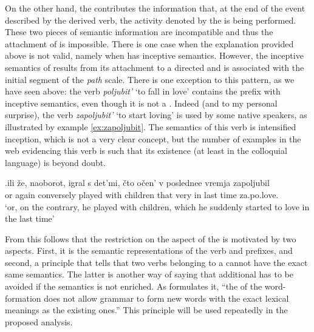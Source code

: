 On the other hand, the   contributes the information that, at the end of the event described by the derived verb, the activity denoted by the  is being performed. These two pieces of semantic information are incompatible and thus the attachment of  is impossible. There is one case when the explanation provided above is not valid, namely when  has inceptive semantics. However, the inceptive semantics of  results from its attachment to a directed  and is associated with the initial segment of the \textit{path} scale. There is one exception to this pattern, as we have seen above: the verb \textit{poljubit'} `to fall in love' contains the prefix  with inceptive semantics, even though it is not a . Indeed (and to my personal surprise), the verb \textit{zapoljubit'} `to start loving' is used by some native speakers, as illustrated by example \ref{ex:zapoljubit}. The semantics of this verb is intensified inception, which is not a very clear concept, but the number of examples in the web evidencing this verb is such that its existence (at least in the colloquial language) is beyond doubt.

\exg.\label{ex:zapoljubit}ili \v{z}e, naoborot, igral s det'mi, \v{c}to o\v{c}en' v poslednee vremja zapoljubil\\
or again conversely played with children that very in last time za.po.love.\\
\trans `or, on the contrary, he played with children, which he suddenly started to love in the last time'

From this follows that the restriction on the aspect of the  is motivated by two aspects. First, it is the semantic representations of the verb and prefixes, and second, a principle that tells that two verbs belonging to a  cannot have the exact same semantics. The latter is another way of saying that additional  has to be avoided if the semantics is not enriched. As \citet{Braginsky:08} formulates it, ``the  of the word-formation does not allow grammar to form new words with the
exact lexical meanings as the existing ones.'' This principle will be used repeatedly in the proposed analysis.



